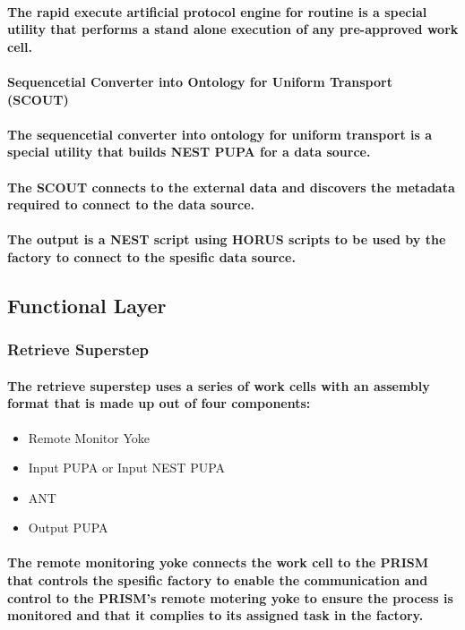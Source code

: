\documentclass{acm_proc_article-sp}
\begin{document}
\paragraph{The rapid execute artificial protocol engine for routine is a special utility that performs a stand alone execution of any pre-approved work cell.}
\paragraph{\textbf{Sequencetial Converter into Ontology for Uniform Transport (SCOUT)}}
\paragraph{The sequencetial converter into ontology for uniform transport is a special utility that builds NEST PUPA for a data source.}
\paragraph{The SCOUT connects to the external data and discovers the metadata required to connect to the data source.}
\paragraph{The output is a NEST script using HORUS scripts to be used by the factory to connect to the spesific data source.}
\subsection{Functional Layer}
\subsubsection{Retrieve Superstep}
\paragraph{The retrieve superstep uses a series of work cells with an assembly format that is made up out of four components:}
\begin{itemize}
\item{Remote Monitor Yoke}
\item{Input PUPA or Input NEST PUPA}
\item{ANT}
\item{Output PUPA}
\end{itemize}
\paragraph{The remote monitoring yoke connects the work cell to the PRISM that controls the spesific factory to enable the communication and control to the PRISM's remote motering yoke to ensure the process is monitored and that it complies to its assigned task in the factory.}
\end{document}
